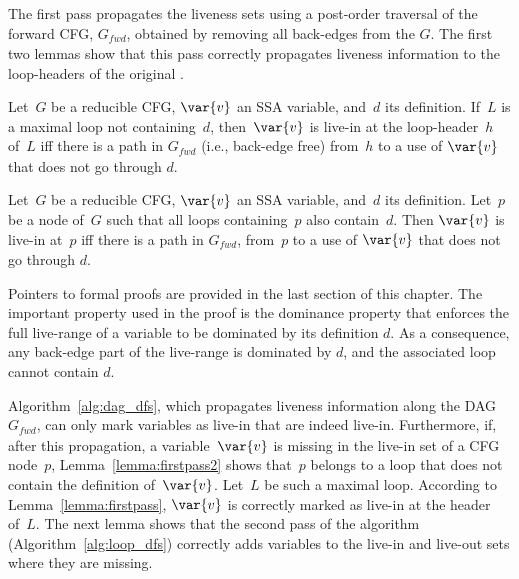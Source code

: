 The first pass propagates the liveness sets using a post-order traversal of the 
forward CFG, $G_{\textit{fwd}}$, obtained by removing all back-edges 
from the \@CFG $G$.
The first two lemmas show that this pass correctly propagates liveness information to the loop-headers of the original \@CFG.
\begin{lemma}
	\label{lemma:firstpass}
	Let~$G$ be a reducible CFG, $\var{v}$ an SSA variable, and~$d$ its definition.
        If~$L$ is a maximal loop not containing~$d$, then~$\var{v}$ is live-in 
        at the loop-header~$h$ of~$L$ iff there is a path in 
        $G_{\textit{fwd}}$ (i.e., back-edge free) from~$h$ to a use 
        of $\var{v}$ that does not go through $d$.
\end{lemma}

\begin{lemma}
	\label{lemma:firstpass2}
	Let~$G$ be a reducible CFG, $\var{v}$ an SSA variable, and~$d$ its definition.
	Let~$p$ be a node of~$G$ such that all loops containing~$p$ also contain~$d$.
        Then $\var{v}$ is live-in at~$p$ iff there is a path in 
        $G_{\textit{fwd}}$, from~$p$ to a use of $\var{v}$ that does 
        not go through $d$.
\end{lemma}

Pointers to formal proofs are provided in the last section of this chapter.
The important property used in the proof is the dominance property that enforces the full live-range of a variable to be dominated by its definition $d$.
As a consequence, any back-edge part of the live-range is dominated by $d$, and 
the associated loop cannot contain $d$.

Algorithm~\ref{alg:dag_dfs}, which propagates liveness information along the DAG $G_{\textit{fwd}}$, can only mark variables as live-in that are indeed live-in.
Furthermore, if, after this propagation, a variable~$\var{v}$ is missing in the live-in set of a CFG node~$p$, Lemma~\ref{lemma:firstpass2} shows that~$p$ belongs to a loop that does not contain the definition of~$\var{v}$.
Let~$L$ be such a maximal loop.
According to Lemma~\ref{lemma:firstpass}, $\var{v}$ is correctly marked as live-in at the header of~$L$.
The next lemma shows that the second pass of the algorithm (Algorithm~\ref{alg:loop_dfs}) correctly adds variables to the live-in and live-out sets where they are missing.

